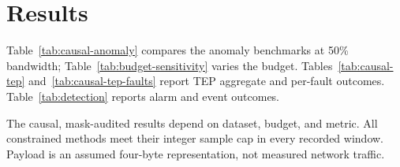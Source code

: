 \documentclass[pdflatex,sn-vancouver-num]{sn-jnl}
\theoremstyle{thmstyleone}
\begin{document}
\section{Results}
Table~\ref{tab:causal-anomaly} compares the anomaly benchmarks at 50\% bandwidth;
Table~\ref{tab:budget-sensitivity} varies the budget.
Tables~\ref{tab:causal-tep} and~\ref{tab:causal-tep-faults} report TEP aggregate and
per-fault outcomes. Table~\ref{tab:detection} reports alarm and event outcomes.

The causal, mask-audited results depend on dataset, budget, and metric. All constrained methods meet their integer sample cap in every recorded window. Payload is an assumed four-byte representation, not measured network traffic.

\begin{table}[t]
\centering
\caption{Corrected causal results at 50\% bandwidth. Values are mean $\pm$ standard deviation across five joint experimental seeds. Full Data is shown as a detector reference. No point adjustment is used.}
\label{tab:causal-anomaly}
\end{table}
\end{document}
